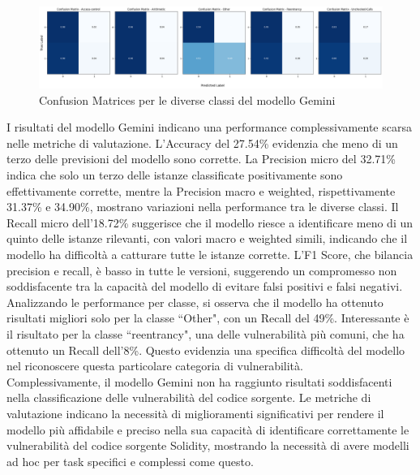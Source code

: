 \documentclass[../../Thesis.tex]{subfiles}
\begin{document}
\begin{figure}[H]
    \includegraphics[width=1.05\textwidth]{../../img/CF-Gemini.png}
    \caption{Confusion Matrices per le diverse classi del modello Gemini}
\end{figure}
    I risultati del modello Gemini indicano una performance complessivamente scarsa nelle metriche di valutazione. L'Accuracy del 27.54\% evidenzia che meno di un terzo delle previsioni del modello sono corrette. La Precision micro del 32.71\% indica che solo un terzo delle istanze classificate positivamente sono effettivamente corrette, mentre la Precision macro e weighted, rispettivamente 31.37\% e 34.90\%, mostrano variazioni nella performance tra le diverse classi. Il Recall micro dell'18.72\% suggerisce che il modello riesce a identificare meno di un quinto delle istanze rilevanti, con valori macro e weighted simili, indicando che il modello ha difficolt\`a a catturare tutte le istanze corrette. L'F1 Score, che bilancia precision e recall, \`e basso in tutte le versioni, suggerendo un compromesso non soddisfacente tra la capacit\`a del modello di evitare falsi positivi e falsi negativi.\\
    Analizzando le performance per classe, si osserva che il modello ha ottenuto risultati migliori solo per la classe ``Other", con un Recall del 49\%. Interessante \`e il risultato per la classe ``reentrancy", una delle vulnerabilit\`a pi\`u comuni, che ha ottenuto un Recall dell'8\%. Questo evidenzia una specifica difficolt\`a del modello nel riconoscere questa particolare categoria di vulnerabilit\`a.\\
    Complessivamente, il modello Gemini non ha raggiunto risultati soddisfacenti nella classificazione delle vulnerabilit\`a del codice sorgente. Le metriche di valutazione indicano la necessit\`a di miglioramenti significativi per rendere il modello pi\`u affidabile e preciso nella sua capacit\`a di identificare correttamente le vulnerabilit\`a del codice sorgente Solidity, mostrando la necessit\`a di avere modelli ad hoc per task specifici e complessi come questo.
\end{document}
